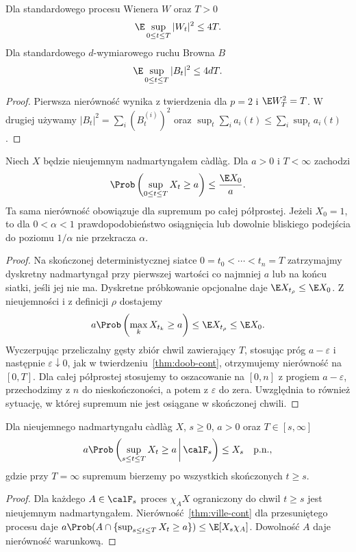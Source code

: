 \begin{wniosek}
Dla standardowego procesu Wienera $W$ oraz $T>0$
\[
\E\sup_{0\le t\le T}|W_t|^2\le4T.
\]
Dla standardowego $d$-wymiarowego ruchu Browna $B$
\[
\E\sup_{0\le t\le T}|B_t|^2\le4dT.
\]
\end{wniosek}
\begin{proof}
Pierwsza nierówność wynika z twierdzenia dla $p=2$
i $\E W_T^2=T$. W drugiej używamy
$|B_t|^2=\sum_i(B_t^{(i)})^2$ oraz
$\sup_t\sum_i a_i(t)\le\sum_i\sup_t a_i(t)$.
\end{proof}

\begin{twierdzenie}
\label{thm:ville-cont}
Niech $X$ będzie nieujemnym nadmartyngałem
c\`adl\`ag. Dla $a>0$ i $T<\infty$ zachodzi
\[
\Prob\left(\sup_{0\le t\le T}X_t\ge a\right)
\le\frac{\E X_0}{a}.
\]
Ta sama nierówność obowiązuje dla supremum po
całej półprostej. Jeżeli $X_0=1$, to dla
$0<\alpha<1$ prawdopodobieństwo osiągnięcia
lub dowolnie bliskiego podejścia do poziomu
$1/\alpha$ nie przekracza $\alpha$.
\end{twierdzenie}
\begin{proof}
Na skończonej deterministycznej siatce
$0=t_0<\cdots<t_n=T$ zatrzymajmy dyskretny
nadmartyngał przy pierwszej wartości co najmniej
$a$ lub na końcu siatki, jeśli jej nie ma.
Dyskretne próbkowanie opcjonalne daje
$\E X_{t_\rho}\le\E X_0$.
Z nieujemności i z definicji $\rho$ dostajemy
\[
a\Prob\left(\max_k X_{t_k}\ge a\right)
\le \E X_{t_\rho}\le\E X_0.
\]
Wyczerpując przeliczalny gęsty zbiór chwil
zawierający $T$, stosując próg $a-\varepsilon$
i następnie $\varepsilon\downarrow0$, jak
w twierdzeniu~\ref{thm:doob-cont}, otrzymujemy
nierówność na $[0,T]$. Dla całej półprostej
stosujemy to oszacowanie na $[0,n]$ z progiem
$a-\varepsilon$, przechodzimy z $n$ do
nieskończoności, a potem z $\varepsilon$ do zera.
Uwzględnia to również sytuację, w której
supremum nie jest osiągane w skończonej chwili.
\end{proof}

\begin{wniosek}
\label{cor:ville-conditional-cont}
Dla nieujemnego nadmartyngału c\`adl\`ag $X$,
$s\ge0$, $a>0$ oraz $T\in[s,\infty]$
\[
a\Prob\left(\sup_{s\le t\le T}X_t\ge a
\,\middle|\,\calF_s\right)\le X_s
\quad\text{p.n.},
\]
gdzie przy $T=\infty$ supremum bierzemy
po wszystkich skończonych $t\ge s$.
\end{wniosek}
\begin{proof}
Dla każdego $A\in\calF_s$ proces $\chi_A X$
ograniczony do chwil $t\ge s$ jest nieujemnym
nadmartyngałem. Nierówność~\ref{thm:ville-cont}
dla przesuniętego procesu daje
$a\Prob(A\cap\{\sup_{s\le t\le T}X_t\ge a\})
\le\E[X_s\chi_A]$.
Dowolność $A$ daje nierówność warunkową.
\end{proof}

